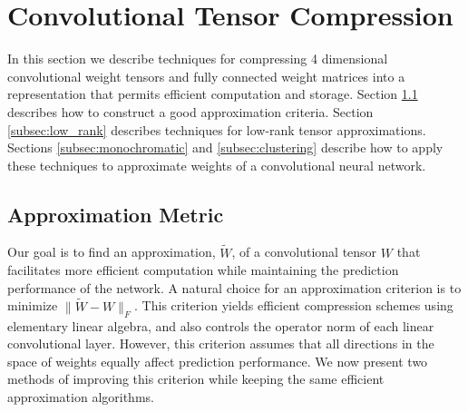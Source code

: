 \section{Convolutional Tensor Compression}\label{sec:approx_tech}
In this section we describe
techniques for compressing 
4 dimensional convolutional weight tensors and fully connected weight matrices into a representation that permits
efficient computation and storage. 
Section \ref{reconstr_sect} describes how to construct a good approximation 
criteria. Section \ref{subsec:low_rank} describes techniques for low-rank tensor
approximations. Sections \ref{subsec:monochromatic} and \ref{subsec:clustering} describe how to 
apply these techniques to approximate weights of a convolutional neural network.


\subsection{Approximation Metric}
\label{reconstr_sect}

Our goal is to find an approximation, $\tilde{W}$, of a convolutional tensor $W$ 
that facilitates more efficient computation while maintaining the prediction performance of the network.
A natural choice for an approximation criterion is
to minimize $\| \tilde{W} - W \|_F$. This criterion yields 
efficient compression schemes using elementary linear algebra, and also controls
the operator norm of each linear convolutional layer.
%
However, this criterion assumes that all directions in the space of weights equally 
affect prediction performance. We now present two methods of improving this criterion while 
keeping the same efficient approximation algorithms.

